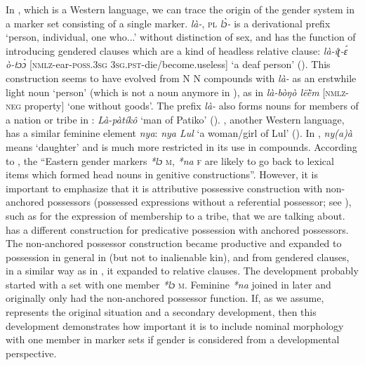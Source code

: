 \documentclass[output=collectionpaper]{langsci/langscibook}
\begin{document}
In , which is a Western  language, we can trace the origin of the gender system in a marker set consisting of a single marker.  \textit{là-}, \textsc{pl} \textit{lɔ̀-} is a derivational prefix `person, individual, one who...' without distinction of sex, and has the function of introducing gendered clauses which are a kind of headless relative clause: \textit{là-íʈ-ɛ́ ò-tɔɔ̀} [\textsc{nmlz}-ear-\textsc{poss.3sg} \textsc{3sg.pst}-die/become.useless] `a deaf person' (\citealt[37]{Crazzolara1955}). This construction seems to have evolved from N N compounds with \textit{là-} as an erstwhile light noun `person' (which is not a noun anymore in ), as in \textit{là-bòŋò lëë̀m} [\textsc{nmlz-neg} property] `one without goods'. The prefix \textit{là-} also forms nouns for members of a nation or tribe in : \textit{Là-pàtíkô} `man of Patiko' (\citealt[42]{Crazzolara1955}). , another Western  language, has a similar feminine element \textit{nya}: \textit{nya Lul} `a woman/girl of Lul' (\citealt[17]{Kohnen1933}). In , \textit{ny(a)à} means `daughter' and is much more restricted in its use in compounds. According to \cite[263]{Heine1983}, the ``Eastern  gender markers \textit{*lɔ} \textsc{m}, \textit{*na} \textsc{f} are likely to go back to lexical items which formed head nouns in genitive constructions''. However, it is important to emphasize that it is attributive possessive construction with non-anchored possessors (possessed expressions without a referential possessor; see \citealt{Koptjevskaja-Tamm2005}), such as for the expression of membership to a tribe, that we are talking about.  has a different construction for predicative possession with anchored possessors. The non-anchored possessor construction became productive and expanded to possession in general in  (but not to inalienable kin), and from gendered clauses, in a similar way as in , it expanded to relative clauses. The development probably started with a set with one member \textit{*lɔ} \textsc{m}. Feminine \textit{*na} joined in later and originally only had the non-anchored possessor function. If, as we assume,  represents the original situation and  a secondary development, then this development demonstrates how important it is to include nominal morphology with one member in marker sets if gender is considered from a developmental perspective.
\end{document}
